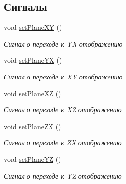 \subsection*{Сигналы}
\begin{DoxyCompactItemize}
\item 
\mbox{\label{class_main_window_a08797b59dd94e93412855093725de550}} 
void \mbox{\hyperlink{class_main_window_a08797b59dd94e93412855093725de550}{set\+Plane\+XY}} ()
\begin{DoxyCompactList}\small\item\em Сигнал о переходе к YX отображению \end{DoxyCompactList}\item 
\mbox{\label{class_main_window_a676452802e26c28c355359025ffa0157}} 
void \mbox{\hyperlink{class_main_window_a676452802e26c28c355359025ffa0157}{set\+Plane\+YX}} ()
\begin{DoxyCompactList}\small\item\em Сигнал о переходе к XY отображению \end{DoxyCompactList}\item 
\mbox{\label{class_main_window_aeef3b9d215f2381eaeda0f049c13afec}} 
void \mbox{\hyperlink{class_main_window_aeef3b9d215f2381eaeda0f049c13afec}{set\+Plane\+XZ}} ()
\begin{DoxyCompactList}\small\item\em Сигнал о переходе к XZ отображению \end{DoxyCompactList}\item 
\mbox{\label{class_main_window_a75db7efaba8c7e5389539d83e97e4c25}} 
void \mbox{\hyperlink{class_main_window_a75db7efaba8c7e5389539d83e97e4c25}{set\+Plane\+ZX}} ()
\begin{DoxyCompactList}\small\item\em Сигнал о переходе к ZX отображению \end{DoxyCompactList}\item 
\mbox{\label{class_main_window_ae93bdd8f0cbada4bdf50d7d0a2f2b6aa}} 
void \mbox{\hyperlink{class_main_window_ae93bdd8f0cbada4bdf50d7d0a2f2b6aa}{set\+Plane\+YZ}} ()
\begin{DoxyCompactList}\small\item\em Сигнал о переходе к YZ отображению \end{DoxyCompactList}\item 

\end{DoxyCompactItemize}
